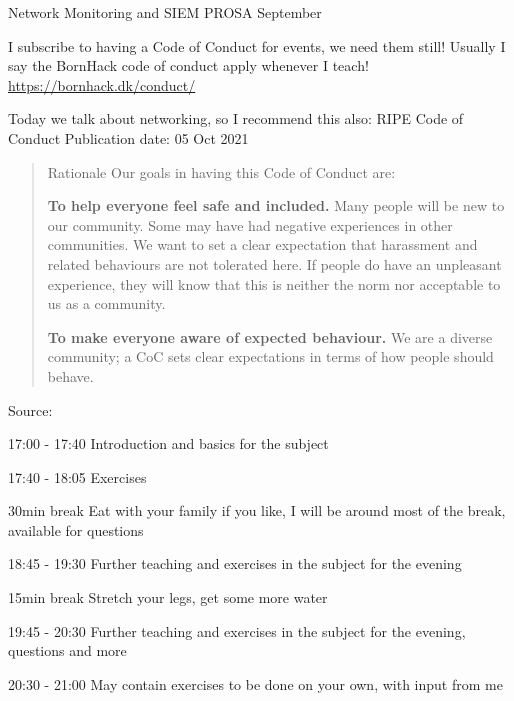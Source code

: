 \documentclass[Screen16to9,17pt]{foils}
\begin{document}
\mytitlepage
{Network Monitoring and SIEM}
{PROSA September \the\year{}}


\hlkprofiluk



I subscribe to having a Code of Conduct for events, we need them still! Usually I say the BornHack code of conduct apply whenever I teach! \url{https://bornhack.dk/conduct/}

Today we talk about networking, so I recommend this also:
RIPE Code of Conduct
Publication date: 05 Oct 2021

\begin{quote}
Rationale
Our goals in having this Code of Conduct are:
\begin{list2}
\item {\bf To help everyone feel safe and included.} Many people will be new to our community. Some may have had negative experiences in other communities. We want to set a clear expectation that harassment and related behaviours are not tolerated here. If people do have an unpleasant experience, they will know that this is neither the norm nor acceptable to us as a community.

\item {\bf To make everyone aware of expected behaviour.} We are a diverse community; a CoC sets clear expectations in terms of how people should behave.
\end{list2}
\end{quote}
Source: {\small
{}}


\begin{list2}
\item 17:00 - 17:40 Introduction and basics for the subject

\item 17:40 - 18:05 Exercises

\item 30min break Eat with your family if you like, I will be around most of the break, available for questions

\item 18:45 - 19:30 Further teaching and exercises in the subject for the evening

\item 15min break Stretch your legs, get some more water

\item 19:45 - 20:30
Further teaching and exercises in the subject for the evening, questions and more

\item 20:30 - 21:00 May contain exercises to be done on your own, with input from me
\end{list2}
\end{document}
